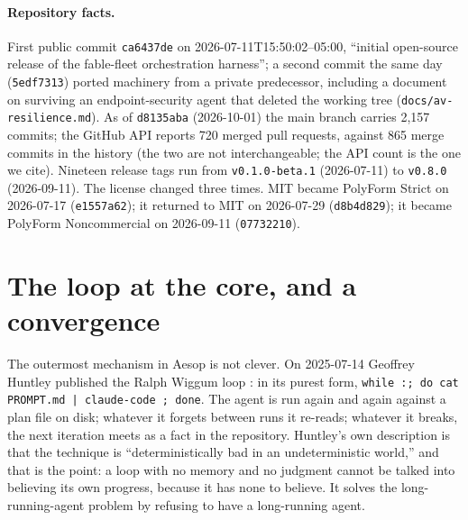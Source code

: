 \documentclass[11pt]{article}
\newcommand{\sha}[1]{\texttt{\small #1}}
\newcommand{\file}[1]{\texttt{\small #1}}
\begin{document}
\paragraph{Repository facts.} First public commit \sha{ca6437de} on 2026-07-11T15:50:02--05:00, ``initial open-source release of the fable-fleet orchestration harness''; a second commit the same day (\sha{5edf7313}) ported machinery from a private predecessor, including a document on surviving an endpoint-security agent that deleted the working tree (\file{docs/av-resilience.md}). As of \sha{d8135aba} (2026-10-01) the main branch carries 2,157 commits; the GitHub API reports 720 merged pull requests, against 865 merge commits in the history (the two are not interchangeable; the API count is the one we cite). Nineteen release tags run from \texttt{v0.1.0-beta.1} (2026-07-11) to \texttt{v0.8.0} (2026-09-11). The license changed three times. MIT became PolyForm Strict on 2026-07-17 (\sha{e1557a62}); it returned to MIT on 2026-07-29 (\sha{d8b4d829}); it became PolyForm Noncommercial on 2026-09-11 (\sha{07732210}).

\section{The loop at the core, and a convergence}
\label{sec:loop}

The outermost mechanism in Aesop is not clever. On 2025-07-14 Geoffrey Huntley published the Ralph Wiggum loop \cite{huntley2025}: in its purest form, \texttt{while :; do cat PROMPT.md | claude-code ; done}. The agent is run again and again against a plan file on disk; whatever it forgets between runs it re-reads; whatever it breaks, the next iteration meets as a fact in the repository. Huntley's own description is that the technique is ``deterministically bad in an undeterministic world,'' and that is the point: a loop with no memory and no judgment cannot be talked into believing its own progress, because it has none to believe. It solves the long-running-agent problem by refusing to have a long-running agent.
\end{document}
